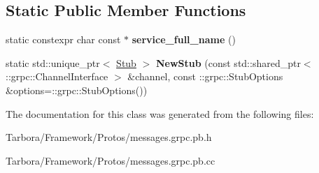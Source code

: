 \subsection*{Static Public Member Functions}
\begin{DoxyCompactItemize}
\item 
\mbox{\label{classtbMessages_1_1TarboraMessages_affb479387f9fc336e1d0693c64600bac}} 
static constexpr char const  $\ast$ {\bfseries service\+\_\+full\+\_\+name} ()
\item 
\mbox{\label{classtbMessages_1_1TarboraMessages_abe196d89e3c6d3f63c8d19b326798361}} 
static std\+::unique\+\_\+ptr$<$ \hyperlink{classtbMessages_1_1TarboraMessages_1_1Stub}{Stub} $>$ {\bfseries New\+Stub} (const std\+::shared\+\_\+ptr$<$ \+::grpc\+::\+Channel\+Interface $>$ \&channel, const \+::grpc\+::\+Stub\+Options \&options=\+::grpc\+::\+Stub\+Options())
\end{DoxyCompactItemize}


The documentation for this class was generated from the following files\+:\begin{DoxyCompactItemize}
\item 
Tarbora/\+Framework/\+Protos/messages.\+grpc.\+pb.\+h\item 
Tarbora/\+Framework/\+Protos/messages.\+grpc.\+pb.\+cc\end{DoxyCompactItemize}
